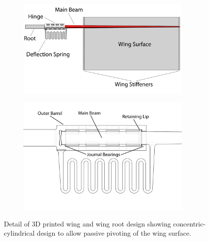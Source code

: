 \documentclass{article}
\begin{document}
\begin{figure}[h]%
\centering
\begin{subfigure}[t]{0.45\textwidth}
    \centering
    \includegraphics[width=0.95\textwidth]{figures/wing1}
    \caption{\label{fig:wing1}}
\end{subfigure}
\begin{subfigure}[t]{0.45\textwidth}
    \centering
    \includegraphics[trim=0 105 0 0, clip, width=0.95\textwidth]{figures/root2}
    \caption{\label{fig:root2}}
\end{subfigure}
\caption{Detail of 3D printed wing  and wing root  design
  showing concentric-cylindrical design to allow passive pivoting of the wing surface.}
\end{figure}
\end{document}

